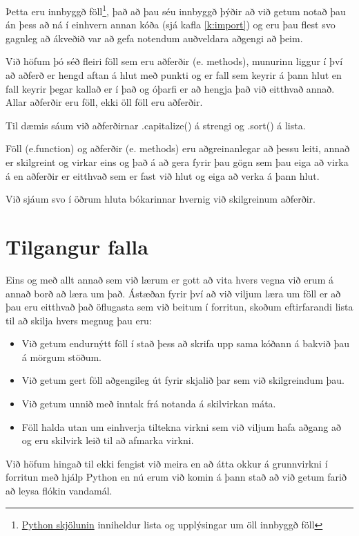 Þetta eru innbyggð föll\footnote{\href{https://docs.python.org/3/library/functions.html}{Python skjölunin} inniheldur lista og upplýsingar um öll innbyggð föll}, það að þau séu innbyggð þýðir að við getum notað þau án þess að ná í einhvern annan kóða (sjá kafla \ref{k:import}) og eru þau flest svo gagnleg að ákveðið var að gefa notendum auðveldara aðgengi að þeim.

Við höfum þó séð fleiri föll sem eru aðferðir (e. methods), munurinn liggur í því að aðferð er hengd aftan á hlut með punkti og er fall sem keyrir á þann hlut en fall keyrir þegar kallað er í það og óþarfi er að hengja það við eitthvað annað.
Allar aðferðir eru föll, ekki öll föll eru aðferðir.

Til dæmis sáum við aðferðirnar .capitalize() á strengi og .sort() á lista.

Föll (e.function) og aðferðir (e. methods) eru aðgreinanlegar að þessu leiti, annað er skilgreint og virkar eins og það á að gera fyrir þau gögn sem þau eiga að virka á en aðferðir er eitthvað sem er fast við hlut og eiga að verka á þann hlut.

Við sjáum svo í öðrum hluta bókarinnar hvernig við skilgreinum aðferðir.

\section{Tilgangur falla}
Eins og með allt annað sem við lærum er gott að vita hvers vegna við erum á annað borð að læra um það.
Ástæðan fyrir því að við viljum læra um föll er að þau eru eitthvað það öflugasta sem við beitum í forritun, skoðum eftirfarandi lista til að skilja hvers megnug þau eru:

\begin{itemize}
	\item Við getum endurnýtt föll í stað þess að skrifa upp sama kóðann á bakvið þau á mörgum stöðum.
	\item Við getum gert föll aðgengileg út fyrir skjalið þar sem við skilgreindum þau.
	\item Við getum unnið með inntak frá notanda á skilvirkan máta.
	\item Föll halda utan um einhverja tiltekna virkni sem við viljum hafa aðgang að og eru skilvirk leið til að afmarka virkni.
\end{itemize}

Við höfum hingað til ekki fengist við meira en að átta okkur á grunnvirkni í forritun með hjálp Python en nú erum við komin á þann stað að við getum farið að leysa flókin vandamál.


